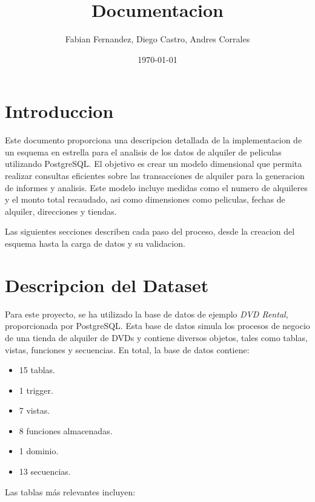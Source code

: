 \documentclass{article}
\title{Documentacion}
\author{Fabian Fernandez, Diego Castro, Andres Corrales}
\date{\today}
\begin{document}
\maketitle

\setlength{\parindent}{0pt}  %

\section{Introduccion}

Este documento proporciona una descripcion detallada de la implementacion de un esquema en estrella para el analisis de los datos de alquiler de peliculas utilizando PostgreSQL. El objetivo es crear un modelo dimensional que permita realizar consultas eficientes sobre las transacciones de alquiler para la generacion de informes y analisis. Este modelo incluye medidas como el numero de alquileres y el monto total recaudado, asi como dimensiones como peliculas, fechas de alquiler, direcciones y tiendas.

Las siguientes secciones describen cada paso del proceso, desde la creacion del esquema hasta la carga de datos y su validacion.

\section{Descripcion del Dataset}

Para este proyecto, se ha utilizado la base de datos de ejemplo \textit{DVD Rental}, proporcionada por PostgreSQL. Esta base de datos simula los procesos de negocio de una tienda de alquiler de DVDs y contiene diversos objetos, tales como tablas, vistas, funciones y secuencias. En total, la base de datos contiene:

\begin{itemize}
    \item 15 tablas.
    \item 1 trigger.
    \item 7 vistas.
    \item 8 funciones almacenadas.
    \item 1 dominio.
    \item 13 secuencias.
\end{itemize}

Las tablas más relevantes incluyen:
\end{document}
